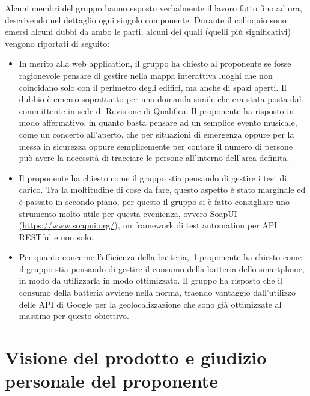 \documentclass{article}
\begin{document}
Alcuni membri del gruppo hanno esposto verbalmente il lavoro fatto fino ad ora, descrivendo nel dettaglio ogni singolo componente.
Durante il colloquio sono emersi alcuni dubbi da ambo le parti, alcuni dei quali (quelli più significativi) vengono riportati di seguito:
\begin{itemize}
  \item In merito alla web application, il gruppo ha chiesto al proponente se fosse ragionevole pensare di gestire nella mappa interattiva luoghi che non coincidano solo con il perimetro degli edifici, ma anche di spazi aperti. Il dubbio è emerso soprattutto per una domanda simile che era stata posta dal committente in sede di Revisione di Qualifica. Il proponente ha risposto in modo affermativo, in quanto basta pensare ad un semplice evento musicale, come un concerto all'aperto, che per situazioni di emergenza oppure per la messa in sicurezza oppure semplicemente per contare il numero di persone può avere la necessità di tracciare le persone all'interno dell'area definita.
  \item Il proponente ha chiesto come il gruppo stia pensando di gestire i test di carico. Tra la moltitudine di cose da fare, questo aspetto è stato marginale ed è passato in secondo piano, per questo il gruppo si è fatto consigliare uno strumento molto utile per questa evenienza, ovvero SoapUI (\href{https://www.soapui.org/}{https://www.soapui.org/}), un framework di test automation per API RESTful e non solo.
  \item Per quanto concerne l'efficienza della batteria, il proponente ha chiesto come il gruppo stia pensando di gestire il consumo della batteria dello smartphone, in modo da utilizzarla in modo ottimizzato. Il gruppo ha risposto che il consumo della batteria avviene nella norma, traendo vantaggio dall'utilizzo delle API di Google per la geolocalizzazione che sono già ottimizzate al massimo per questo obiettivo.
\end{itemize}

\section{Visione del prodotto e giudizio personale del proponente}%
\label{sec:visione_del_prodotto_e_giudizio_personale_del_proponente}
\end{document}

